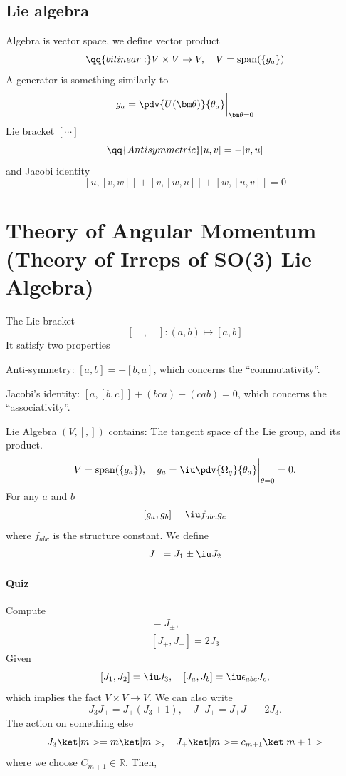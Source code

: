 \subsection{Lie algebra}

Algebra is vector space, we define vector product
\[
  \qq{bilinear:} V \times V \to V, \quad
  V = \operatorname{span}(\{g_a\})
\]
A generator is something similarly to
\[
  g_a = \pdv{U(\bm \theta)}{\theta_a} \bigg|_{\bm\theta = 0}
\]
Lie bracket $[\cdots]$
\[
  \qq{Antisymmetric} [u, v] = -[v, u]
\]
and Jacobi identity
\[
  [u,[v,w]] + [v,[w,u]] + [w,[u,v]] = 0
\]

\section{Theory of Angular Momentum (Theory of Irreps of SO(3) Lie Algebra)}

The Lie bracket
\[
  [\quad, \quad]: (a,b) \mapsto [a,b]
\]
It satisfy two properties
\begin{enumext}
  \item Anti-symmetry: $[a,b] = -[b,a]$, which concerns the ``commutativity''.
  \item Jacobi's identity: $[a, [b,c]] + (bca) + (cab) = 0$, which concerns
  the ``associativity''.
\end{enumext}
Lie Algebra $(V,[,])$ contains: The tangent space of the Lie group,
and its product.
\[
  V = \operatorname{span} (\{g_a\}), \quad
  g_a = \iu \pdv{\Omega_q}{\theta_a} \bigg|_{\theta = 0} = 0.
\]
For any $a$ and $b$
\[
  [g_a, g_b] = \iu f_{abc}g_c
\]
where $f_{abc}$ is the structure constant.
We define
\begin{equation}
  J_\pm = J_1 \pm \iu J_2
\end{equation}
\paragraph{Quiz}
Compute
\begin{gather}
  [J_3, J_\pm] = J_\pm,\\
  [J_+, J_-] = 2J_3
\end{gather}
Given
\[
  [J_1, J_2] = \iu J_3, \quad
  [J_a, J_b] = \iu\epsilon_{abc} J_c,
\]
which implies the fact $V \times V \to V$.
We can also write
\[
  J_3J_\pm = J_\pm(J_3 \pm 1), \quad
  J_-J_+ = J_+J_- - 2J_3.
\]
The action on something else
\[
  J_3\ket|m> = m\ket|m>, \quad
  J_+\ket|m> = c_{m+1}\ket|m + 1>
\]
where we choose $C_{m+1} \in \mathbb R$.
Then,
